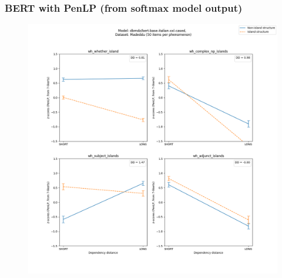\subsubsection{BERT with PenLP (from softmax model output)}
\begin{figure}[h]
	\centering
	\includegraphics[width=1\textwidth]{images/AppendixA/Madeddu_wh_dbmdz_bert-base-italian-xxl-cased_PenLP-zscores-likert-2022-07-11.png} 
\end{figure}

\clearpage
